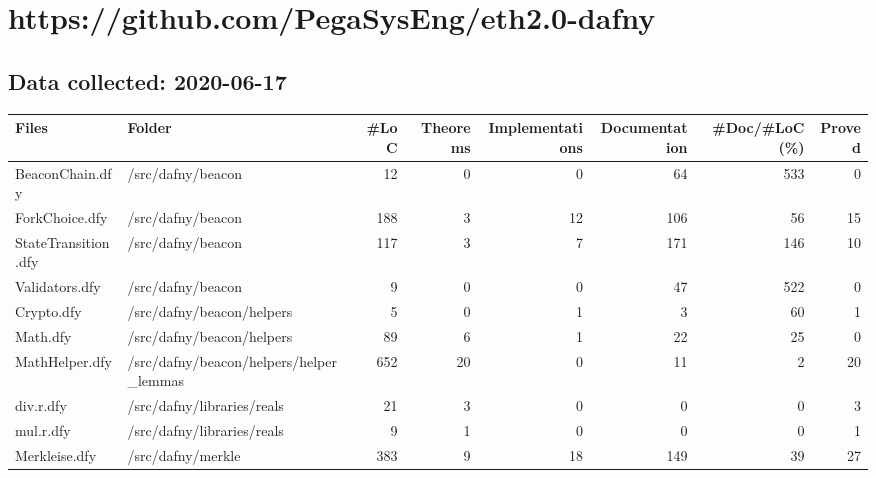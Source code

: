 \documentclass[a4paper, 12pt]{article}
\begin{document}
\section*{https://github.com/PegaSysEng/eth2.0-dafny}
\subsection*{Data collected: 2020-06-17}
\scriptsize
\begin{tabular}{llrrrrrr}
\toprule
                          Files &                                          Folder &  \#LoC &  Theorems &  Implementations &  Documentation &  \#Doc/\#LoC (\%) &  Proved \\
\midrule
                BeaconChain.dfy &                               /src/dafny/beacon &    12 &         0 &                0 &             64 &            533 &       0 \\
                 ForkChoice.dfy &                               /src/dafny/beacon &   188 &         3 &               12 &            106 &             56 &      15 \\
            StateTransition.dfy &                               /src/dafny/beacon &   117 &         3 &                7 &            171 &            146 &      10 \\
                 Validators.dfy &                               /src/dafny/beacon &     9 &         0 &                0 &             47 &            522 &       0 \\
                     Crypto.dfy &                       /src/dafny/beacon/helpers &     5 &         0 &                1 &              3 &             60 &       1 \\
                       Math.dfy &                       /src/dafny/beacon/helpers &    89 &         6 &                1 &             22 &             25 &       0 \\
                 MathHelper.dfy &         /src/dafny/beacon/helpers/helper\_lemmas &   652 &        20 &                0 &             11 &              2 &      20 \\
                      div.r.dfy &                      /src/dafny/libraries/reals &    21 &         3 &                0 &              0 &              0 &       3 \\
                      mul.r.dfy &                      /src/dafny/libraries/reals &     9 &         1 &                0 &              0 &              0 &       1 \\
                  Merkleise.dfy &                               /src/dafny/merkle &   383 &         9 &               18 &            149 &             39 &      27 \\

\end{tabular}
\end{document}
